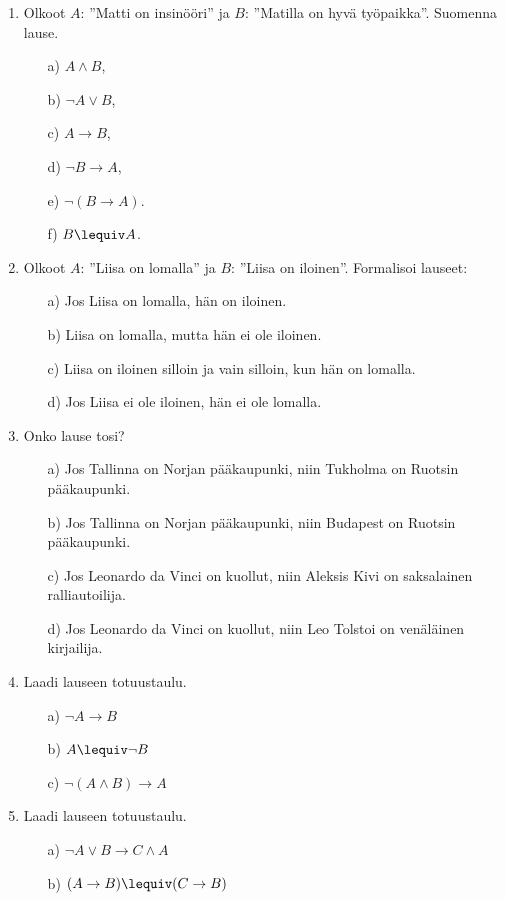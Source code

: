\begin{enumerate}
\item Olkoot $A$: ''Matti on insinööri'' ja $B$: ''Matilla on hyvä työpaikka''.
Suomenna lause.
\begin{itemize}
\item[a)] $A\land B$,
\item[b)] $\lnot A \lor B$,
\item[c)] $A\to B$,
\item[d)] $\lnot B\to A$,
\item[e)] $\lnot( B \to A )$.
\item[f)] $ B \lequiv A$.
\end{itemize}

\item Olkoot $A$: ''Liisa on lomalla'' ja $B$: ''Liisa on iloinen''. Formalisoi lauseet:
\begin{itemize}
\item[a)] Jos Liisa on lomalla, hän on iloinen.
\item[b)] Liisa on lomalla, mutta hän ei ole iloinen.
\item[c)] Liisa on iloinen silloin ja vain silloin, kun hän on lomalla.
\item[d)] Jos Liisa ei ole iloinen, hän ei ole lomalla.
\end{itemize}

\item Onko lause tosi?
\begin{itemize}
\item[a)] Jos Tallinna on Norjan pääkaupunki, niin Tukholma on Ruotsin pääkaupunki.
\item[b)] Jos Tallinna on Norjan pääkaupunki, niin Budapest on Ruotsin pääkaupunki.
\item[c)] Jos Leonardo da Vinci on kuollut, niin Aleksis Kivi on saksalainen ralliautoilija.
\item[d)] Jos Leonardo da Vinci on kuollut, niin Leo Tolstoi on venäläinen kirjailija.
\end{itemize}

\item Laadi lauseen totuustaulu.
\begin{itemize}
\item[a)] $\lnot A \to B$
\item[b)] $A\lequiv \lnot B$
\item[c)] $\lnot( A\land B )\to A$
\end{itemize}

\item Laadi lauseen totuustaulu.
\begin{itemize}
\item[a)] $\lnot A \lor B \to C \land A$
\item[b)] $( A\to B ) \lequiv (C\to B)$
\end{itemize}


\end{enumerate}
